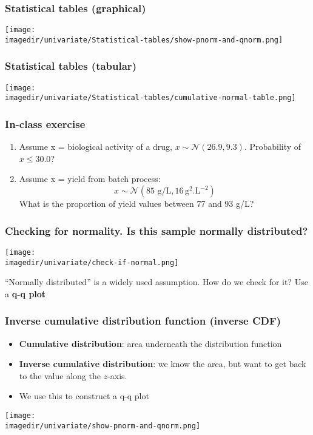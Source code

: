 \begin{frame}\frametitle{Statistical tables (graphical)}
	\begin{center}
		\texttt{[image: \\imagedir/univariate/Statistical-tables/show-pnorm-and-qnorm.png]}
	\end{center}
\end{frame}

\begin{frame}\frametitle{Statistical tables (tabular)}
	\begin{center}
		\texttt{[image: \\imagedir/univariate/Statistical-tables/cumulative-normal-table.png]}
	\end{center}
\end{frame}

\begin{frame}\frametitle{In-class exercise}
	\begin{enumerate}
		\item	Assume x = biological activity of a drug, $x \sim \mathcal{N}(26.9, 9.3)$. Probability of $x \leq 30.0$?
		\vspace{24pt}
		\item	Assume x = yield from batch process:
				$$x \sim \mathcal{N}(85 \text{~g/L}, 16\, \text{g}^2\text{.L}^{-2})$$
				What is the proportion of yield values between 77 and 93 g/L?
	\end{enumerate}
	
\end{frame}

\begin{frame}\frametitle{Checking for normality. Is this sample normally distributed?}
	\begin{center}
		\texttt{[image: \\imagedir/univariate/check-if-normal.png]}
	\end{center}
	``Normally distributed'' is a widely used assumption. How do we check for it? Use a \textbf{q-q plot}
\end{frame}

\begin{frame}\frametitle{Inverse cumulative distribution function (inverse CDF)}
	\begin{itemize}
		\item	\textbf{Cumulative distribution}: area underneath the distribution function
		\item	\textbf{Inverse cumulative distribution}: we know the area, but want to get back to the value along the $z$-axis.
		\item	We use this to construct a q-q plot
	\end{itemize}
	\vspace{-4pt}
	\begin{center}
		\texttt{[image: \\imagedir/univariate/show-pnorm-and-qnorm.png]}
	\end{center}
\end{frame}

